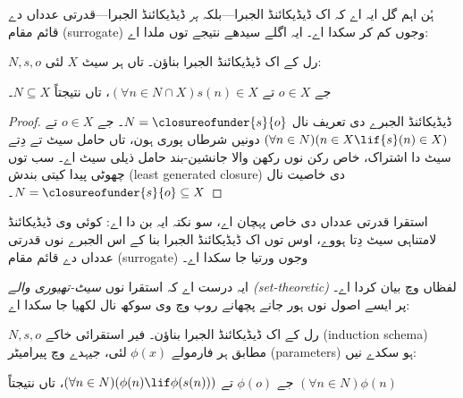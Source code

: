 \documentclass[../../../include/open-logic-section]{subfiles}
\begin{document}

ہُن اہم گل ایہ اے کہ اک ڈیڈیکائنڈ الجبرا---بلکہ
\emph{ہر} ڈیڈیکائنڈ الجبرا---قدرتی عدداں دے قائم مقام (surrogate)
وجوں کم کر سکدا اے۔ ایہ اگلے سیدھے نتیجے توں ملدا اے:

\begin{thm}
$N, s, o$ رل کے اک ڈیڈیکائنڈ الجبرا بناؤن۔ تاں ہر سیٹ $X$ لئی:
	\begin{center}
		جے $o \in X$ تے $(\forall {n} \in N \cap X){s}({n}) \in X$، {تاں} نتیجتاً $N \subseteq X$۔
	\end{center}
\end{thm}

\begin{proof}
ڈیڈیکائنڈ الجبرے دی تعریف نال $N = \closureofunder{s}{o}$۔ جے
${o} \in X$ تے $(\forall {n} \in N)(n \in X \lif
{s}({n}) \in X)$ دونیں شرطاں پوری ہون، تاں حامل سیٹ تے دِتے سیٹ دا
اشتراک، خاص رکن نوں رکھن والا جانشین-بند حامل ذیلی سیٹ اے۔ سب توں
چھوٹی پیدا کیتی بندش (least generated closure) دی خاصیت نال
$N = \closureofunder{s}{o} \subseteq X$۔
\end{proof}

استقرا قدرتی عدداں دی خاص پہچان اے، سو نکتہ ایہ بن دا اے: کوئی وی
ڈیڈیکائنڈ لامتناہی سیٹ دِتا ہووے، اوس توں اک ڈیڈیکائنڈ الجبرا بنا کے
اس الجبرے نوں قدرتی عدداں دے قائم مقام (surrogate) وجوں ورتیا جا
سکدا اے۔

ایہ درست اے کہ  استقرا نوں
\emph{سیٹ-تھیوری والے (set-theoretic)} لفظاں وچ بیان کردا اے۔ پر
ایسے اصول نوں ہور جانے پچھانے روپ وچ وی سوکھ نال لکھیا جا سکدا اے:

\begin{cor}
$N, s, o$ رل کے اک ڈیڈیکائنڈ الجبرا بناؤن۔ فیر استقرائی خاکے
(induction schema) مطابق ہر فارمولے $\phi(x)$ لئی، جیہدے وچ پیرامیٹر
(parameters) ہو سکدے نیں:
\begin{center}
	جے $\phi(o)$ تے $(\forall {n} \in N)(\phi(n)\lif
	\phi({s}({n})))$، {تاں} نتیجتاً $(\forall n \in N)\phi(n)$
\end{center}
\end{cor}
\end{document}
